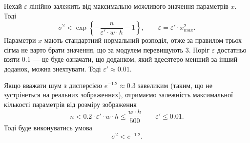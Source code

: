 Нехай $\varepsilon$ лінійно залежить від максимально можливого значення
параметрів $x$.
Тоді
\begin{equation*}
  \sigma^2
  < \exp{\left\{
      - \frac{n}{\varepsilon' \cdot w \cdot h}
      - 1
    \right\}},
    \qquad \varepsilon = \varepsilon' \cdot x_{max}^2.
\end{equation*}
Параметри $x$ мають стандартний нормальний розподіл,
отже за правилом трьох сігма не варто брати значення,
що за модулем перевищують 3.
Поріг $\varepsilon$ достатньо взяти $0.1$ ---
це буде означати, що доданком,
який вдесятеро менший за інший доданок,
можна знехтувати.
Тоді $\varepsilon' \approx 0.01$.

Якщо вважати шум з дисперсією $e^{-1.2} \approx 0.3$ завеликим
(таким, що не зустрінеться на реальних зображеннях),
отримаємо залежність максимальної кількості параметрів
від розміру зображення
\begin{equation}\label{eq:negligible_x}
  n
  < 0.2 \cdot \varepsilon' \cdot w \cdot h
  \le \frac{w \cdot h}{500}
  \qquad \varepsilon' \le 0.01.
\end{equation}
Тоді буде виконуватись умова
\begin{equation*}
  \sigma^2 < e^{-1.2}.
\end{equation*}

